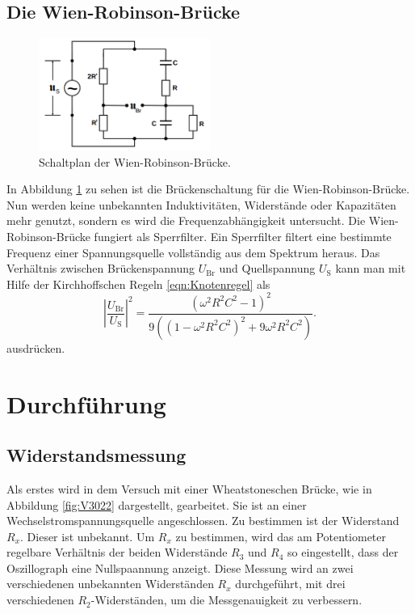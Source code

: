 \documentclass[
  bibliography=totoc,     %
  captions=tableheading,  %
  titlepage=firstiscover, %
]{scrartcl}
\begin{document}
\subsection{Die Wien-Robinson-Brücke}
\begin{figure}[htb]
  \centering
  \includegraphics[width=0.5\textwidth]{V3026.png}
  \caption{Schaltplan der Wien-Robinson-Brücke. \cite{anleitung}}
  \label{fig:V3026}
\end{figure}
In Abbildung \ref{fig:V3026} zu sehen ist die Brückenschaltung für die
Wien-Robinson-Brücke. Nun werden keine unbekannten Induktivitäten, Widerstände
oder Kapazitäten mehr genutzt, sondern es wird die Frequenzabhängigkeit
untersucht. Die Wien-Robinson-Brücke fungiert als Sperrfilter. Ein Sperrfilter
filtert eine bestimmte Frequenz einer Spannungsquelle vollständig aus dem
Spektrum heraus. Das Verhältnis zwischen Brückenspannung $U_\mathup{Br}$ und Quellspannung
$U_\mathup{S}$ kann man mit Hilfe der Kirchhoffschen Regeln \eqref{eqn:Knotenregel} als
\begin{equation}
    \label{eqn:wien_robinson_1}
    \left|\frac{U_\mathup{Br}}{U_\mathup{S}}\right|^2 = \frac{\left(\omega^2 R^2 C^2 - 1\right)^2}{9\left(\left(1 - \omega^2 R^2 C^2\right)^2 + 9 \omega^2 R^2 C^2\right)}.
\end{equation}
ausdrücken.
\newpage
\section{Durchführung}
\label{sec:durchführung}
\subsection{Widerstandsmessung}
Als erstes wird in dem Versuch mit einer Wheatstoneschen Brücke, wie in
Abbildung \ref{fig:V3022} dargestellt, gearbeitet. Sie ist an einer
Wechselstromspannungsquelle angeschlossen. Zu bestimmen ist der Widerstand $R_x$.
Dieser ist unbekannt. Um $R_x$ zu bestimmen, wird das am Potentiometer
regelbare Verhältnis der beiden Widerstände $R_3$ und $R_4$ so eingestellt, dass
der Oszillograph eine Nullspaannung anzeigt. Diese Messung wird an zwei
verschiedenen unbekannten Widerständen $R_x$ durchgeführt, mit drei verschiedenen
$R_2$-Widerständen, um die Messgenauigkeit zu verbessern.
\end{document}
